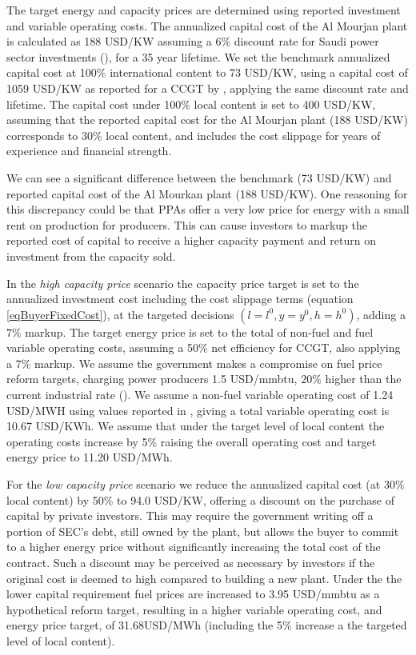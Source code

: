 \documentclass[informs]{informs3}
\begin{document}
The target energy and capacity prices are determined using reported investment and variable operating costs. The annualized capital cost of the Al Mourjan plant is calculated as 188 USD/KW assuming a 6\% discount rate for Saudi power sector investments (\citealp{Matar_et_al_2016}), for a 35 year lifetime. We set the benchmark annualized capital cost at 100\% international content to 73 USD/KW, using a capital cost of 1059 USD/KW as reported for a CCGT by \cite{Rioux_et_al_2017}, applying the same discount rate and lifetime. The capital cost under 100\% local content is set to 400 USD/KW, assuming that the reported capital cost for the Al Mourjan plant (188 USD/KW) corresponds to 30\%  local content, and includes the cost slippage for years of experience and financial strength.

We can see a significant difference between the benchmark (73 USD/KW) and reported capital cost of the Al Mourkan plant (188 USD/KW). One reasoning for this discrepancy could be that PPAs offer a very low price for energy with a small rent on production for producers. This can cause investors to markup the reported cost of capital to receive a higher capacity payment and return on investment from the capacity sold. 

 In the \textit{high capacity price} scenario the capacity price target is set to the annualized investment cost including the cost slippage terms (equation \ref{eqBuyerFixedCost}), at the targeted decisions $(l=l^{0}, y=y^{0}, h=h^{0})$,  adding a $7\%$ markup. The target energy price is set to the total of non-fuel and fuel variable operating costs, assuming a 50\% net efficiency for CCGT, also applying a $7\%$ markup.  We assume the government makes a compromise on fuel price reform targets, charging power producers 1.5 USD/mmbtu, $20\%$ higher than the current industrial rate (\citealp{Fattouh_2018}). We assume a non-fuel variable operating cost of 1.24 USD/MWH using values reported in \cite{Rioux_et_al_2017}, giving a total variable operating cost is 10.67 USD/KWh. We assume that under the target level of local content the operating costs increase by 5\% raising the overall operating cost and target energy price to 11.20 USD/MWh.

For the \textit{low capacity price} scenario we reduce the annualized capital cost (at 30\% local content) by 50\% to 94.0 USD/KW, offering a discount on the purchase of capital by private investors. This may require the government writing off a portion of SEC’s debt, still owned by the plant, but allows the buyer to commit to a higher energy price without significantly increasing the total cost of the contract.  Such a discount may be perceived as necessary by investors if the original cost is deemed to high compared to building a new plant. Under the the lower capital requirement fuel prices are increased to 3.95 USD/mmbtu as a hypothetical reform target, resulting in a higher variable operating cost, and energy price target, of  31.68USD/MWh (including the 5\% increase a the targeted level of local content).
\end{document}
